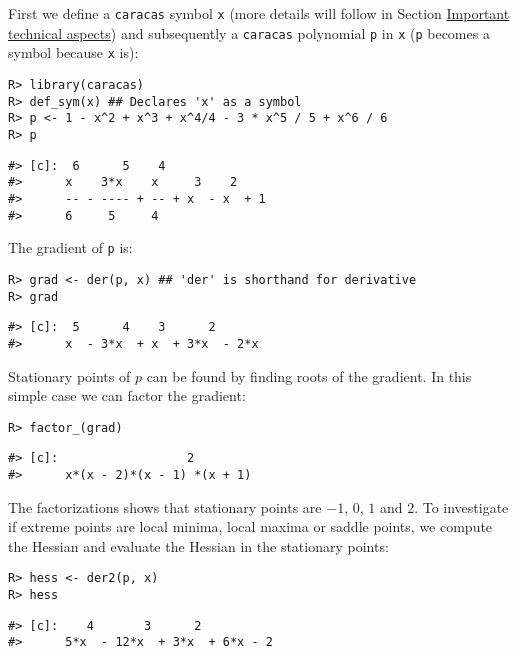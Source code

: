 First we define a \texttt{caracas} symbol \texttt{x} (more details will follow
in Section \protect\hyperlink{important-technical-aspects}{Important technical aspects}) and
subsequently a \texttt{caracas} polynomial \texttt{p} in \texttt{x} (\texttt{p} becomes a symbol because \texttt{x} is):

\begin{verbatim}
R> library(caracas)
R> def_sym(x) ## Declares 'x' as a symbol
R> p <- 1 - x^2 + x^3 + x^4/4 - 3 * x^5 / 5 + x^6 / 6
R> p
\end{verbatim}

\begin{verbatim}
#> [c]:  6      5    4              
#>      x    3*x    x     3    2    
#>      -- - ---- + -- + x  - x  + 1
#>      6     5     4
\end{verbatim}

The gradient of \texttt{p} is:

\begin{verbatim}
R> grad <- der(p, x) ## 'der' is shorthand for derivative
R> grad
\end{verbatim}

\begin{verbatim}
#> [c]:  5      4    3      2      
#>      x  - 3*x  + x  + 3*x  - 2*x
\end{verbatim}

Stationary points of \(p\) can be found by finding roots of the gradient. In this simple case we can factor the gradient:

\begin{verbatim}
R> factor_(grad)
\end{verbatim}

\begin{verbatim}
#> [c]:                  2        
#>      x*(x - 2)*(x - 1) *(x + 1)
\end{verbatim}

The factorizations shows that stationary points are \(-1\), \(0\), \(1\) and \(2\). To
investigate if extreme points are local minima, local maxima or saddle
points, we compute the Hessian and evaluate the Hessian in the
stationary points:

\begin{verbatim}
R> hess <- der2(p, x)
R> hess
\end{verbatim}

\begin{verbatim}
#> [c]:    4       3      2          
#>      5*x  - 12*x  + 3*x  + 6*x - 2
\end{verbatim}

